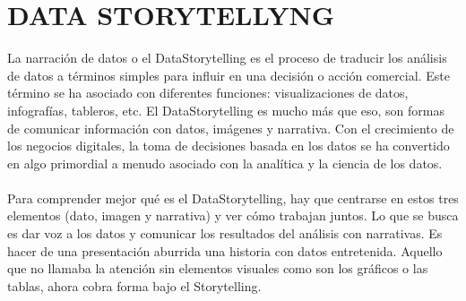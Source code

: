 \documentclass[a4paper,12pt,twocolumn]{article}
\begin{document}
\section*{DATA STORYTELLYNG}
\item{La narración de datos o el DataStorytelling es el proceso de traducir los análisis de datos a términos simples para influir en una decisión o acción comercial. Este término se ha asociado con diferentes funciones: visualizaciones de datos, infografías, tableros, etc. El DataStorytelling es mucho más que eso, son formas de comunicar información con datos, imágenes y narrativa. Con el crecimiento de los negocios digitales, la toma de decisiones basada en los datos se ha convertido en algo primordial a menudo asociado con la analítica y la ciencia de los datos.\\\\
Para comprender mejor qué es el DataStorytelling, hay que centrarse en estos tres elementos (dato, imagen y narrativa) y ver cómo trabajan juntos. Lo que se busca es dar voz a los datos y comunicar los resultados del análisis con narrativas. Es hacer de una presentación aburrida una historia con datos entretenida. Aquello que no llamaba la atención sin elementos visuales como son los  gráficos o las tablas, ahora cobra forma bajo el Storytelling.}
\end{document}
